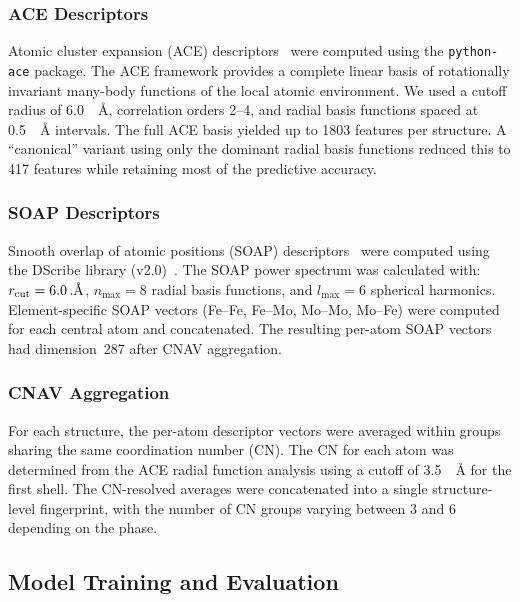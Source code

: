 \subsubsection*{ACE Descriptors}

Atomic cluster expansion (ACE) descriptors~\cite{ace} were computed using the \texttt{python-ace} package. The ACE framework provides a complete linear basis of rotationally invariant many-body functions of the local atomic environment. We used a cutoff radius of \SI{6.0}{\textnormal{~\AA}}, correlation orders 2--4, and radial basis functions spaced at \SI{0.5}{\textnormal{~\AA}} intervals. The full ACE basis yielded up to 1803 features per structure. A ``canonical'' variant using only the dominant radial basis functions reduced this to 417 features while retaining most of the predictive accuracy.

\subsubsection*{SOAP Descriptors}

Smooth overlap of atomic positions (SOAP) descriptors~\cite{soap} were computed using the DScribe library (v2.0)~\cite{dsribe}. The SOAP power spectrum was calculated with: $r_\text{cut} = \SI{6.0}{\textnormal{~\AA}}$, $n_\text{max} = 8$ radial basis functions, and $l_\text{max} = 6$ spherical harmonics. Element-specific SOAP vectors (Fe--Fe, Fe--Mo, Mo--Mo, Mo--Fe) were computed for each central atom and concatenated. The resulting per-atom SOAP vectors had dimension~287 after CNAV aggregation.

\subsubsection*{CNAV Aggregation}

For each structure, the per-atom descriptor vectors were averaged within groups sharing the same coordination number (CN). The CN for each atom was determined from the ACE radial function analysis using a cutoff of \SI{3.5}{\textnormal{~\AA}} for the first shell. The CN-resolved averages were concatenated into a single structure-level fingerprint, with the number of CN groups varying between 3 and 6 depending on the phase.

\subsection{Model Training and Evaluation}

